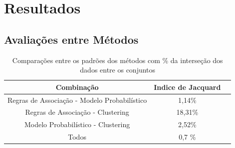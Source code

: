 \section{Resultados}
\subsection{Avaliações entre Métodos}

\begin{table}[H]
\centering
\begin{tabular}{ | c | c | c | }
  \hline
  Combinação & Indice de Jacquard \\
  \hline
  Regras de Associação - Modelo Probabilístico & 1,14\% \\
  \hline
  Regras de Associação - Clustering &  18,31\% \\
  \hline
  Modelo Probabilístico - Clustering & 2,52\% \\
  \hline
  Todos & 0,7 \% \\
  \hline
\end{tabular}
\caption{ Comparações entre os padrões dos métodos com \% da interseção dos
  dados entre os conjuntos }
\label{comp}
\end{table}
